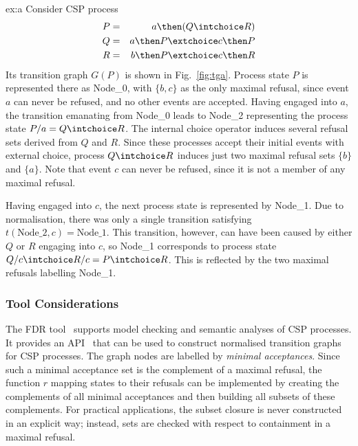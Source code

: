 \begin{example}{ex:a}
Consider CSP process
\begin{eqnarray*}
P & = & a \then (Q\intchoice R)
\\
Q & = & a \then P \extchoice c \then P
\\
R & = & b \then P \extchoice c \then R
\end{eqnarray*}
Its transition graph $G(P)$ is shown in Fig.~\ref{fig:tga}. Process state $P$ is represented there as Node\_0, with $\{ b,c\}$ as the only maximal refusal, since event $a$ can never be refused, and no other events are accepted. Having engaged into $a$, the transition emanating from Node\_0 leads to Node\_2 representing  the process state
$P/a = Q\intchoice R$. The internal choice operator induces several refusal sets derived from $Q$ and $R$. Since these processes accept their initial events with external choice,
process $Q\intchoice R$ induces just two maximal refusal sets $\{b\}$ and
$\{a\}$. Note that event $c$ can never be refused, since it is not a member of any
maximal refusal.

Having engaged into $c$, the next process state is represented by Node\_1. Due to normalisation, there was only a single transition satisfying
$t(\text{Node\_2},c) = \text{Node\_1}$. This transition, however, can have been caused
by either $Q$ or $R$ engaging into $c$, so Node\_1 corresponds to process state
$Q/c \intchoice R/c = P \intchoice R$. This is reflected by the two maximal refusals
labelling Node\_1.
\end{example}

\subsubsection*{Tool Considerations}
The FDR tool~\cite{fdr} supports model checking and semantic analyses of CSP processes.
It provides an API~\cite{fdrmanual} that can be used to construct normalised transition graphs for CSP processes. The graph  nodes are labelled by \emph{minimal acceptances}. Since such a minimal acceptance set is the complement of a maximal refusal, the function $r$ mapping states
to their refusals can be implemented by creating the complements of all minimal acceptances
and then building all subsets of these complements. For practical applications,
the subset closure is never constructed in an explicit way; instead, sets are checked
with respect to containment in a maximal refusal.

%




